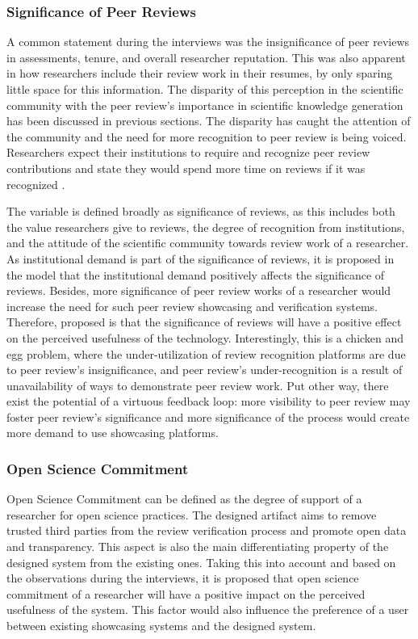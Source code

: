\subsubsection{Significance of Peer Reviews}

A common statement during the interviews was the insignificance of peer reviews in assessments, tenure, and overall researcher reputation. This was also apparent in how researchers include their review work in their resumes, by only sparing little space for this information. The disparity of this perception in the scientific community with the peer review's importance in scientific knowledge generation has been discussed in previous sections. The disparity has caught the attention of the community \parencite{Verissimo.2013, Tennant.2020} and the need for more recognition to peer review is being voiced. Researchers expect their institutions to require and recognize peer review contributions \parencite{Publons.2018} and state they would spend more time on reviews if it was recognized \parencite{Warne.2016}.

The variable is defined broadly as significance of reviews, as this includes both the value researchers give to reviews, the degree of recognition from institutions, and the attitude of the scientific community towards review work of a researcher. As institutional demand is part of the significance of reviews, it is proposed in the model that the institutional demand positively affects the significance of reviews. Besides, more significance of peer review works of a researcher would increase the need for such peer review showcasing and verification systems. Therefore, proposed is that the significance of reviews will have a positive effect on the perceived usefulness of the technology. Interestingly, this is a chicken and egg problem, where the under-utilization of review recognition platforms are due to peer review's insignificance, and peer review's under-recognition is a result of unavailability of ways to demonstrate peer review work. Put other way, there exist the potential of a virtuous feedback loop: more visibility to peer review may foster peer review's significance and more significance of the process would create more demand to use showcasing platforms.

\subsubsection{Open Science Commitment}

Open Science Commitment can be defined as the degree of support of a researcher for open science practices. The designed artifact aims to remove trusted third parties from the review verification process and promote open data and transparency. This aspect is also the main differentiating property of the designed system from the existing ones. Taking this into account and based on the observations during the interviews, it is proposed that open science commitment of a researcher will have a positive impact on the perceived usefulness of the system. This factor would also influence the preference of a user between existing showcasing systems and the designed system. 

